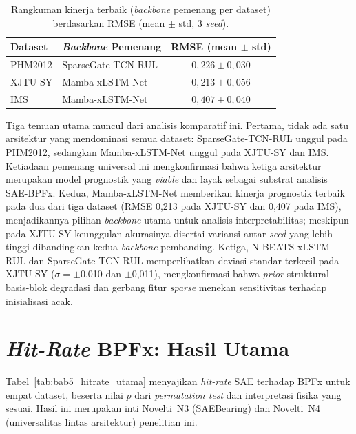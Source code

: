 \begin{table}[ht]
\centering
\caption{Rangkuman kinerja terbaik (\emph{backbone} pemenang per dataset)
         berdasarkan RMSE (mean $\pm$ std, 3 \emph{seed}).}
\label{tab:bab5_ringkasan_rul}
\small
\begin{tabular}{@{}llc@{}}
\toprule
\textbf{Dataset} & \textbf{\emph{Backbone} Pemenang} &
  \textbf{RMSE (mean $\pm$ std)} \\
\midrule
PHM2012  & SparseGate-TCN-RUL   & $0{,}226 \pm 0{,}030$ \\
XJTU-SY & Mamba-xLSTM-Net      & $0{,}213 \pm 0{,}056$ \\
IMS      & Mamba-xLSTM-Net       & $0{,}407 \pm 0{,}040$ \\
\bottomrule
\end{tabular}
\end{table}

Tiga temuan utama muncul dari analisis komparatif ini.
Pertama, tidak ada satu arsitektur yang mendominasi semua dataset:
SparseGate-TCN-RUL unggul pada PHM2012, sedangkan Mamba-xLSTM-Net unggul
pada XJTU-SY dan IMS.
Ketiadaan pemenang universal ini mengkonfirmasi bahwa ketiga arsitektur
merupakan model prognostik yang \emph{viable} dan layak sebagai substrat
analisis SAE-BPFx.
Kedua, Mamba-xLSTM-Net memberikan kinerja prognostik terbaik pada dua dari
tiga dataset (RMSE 0{,}213 pada XJTU-SY dan 0{,}407 pada IMS), menjadikannya
pilihan \emph{backbone} utama untuk analisis interpretabilitas; meskipun pada
XJTU-SY keunggulan akurasinya disertai variansi antar-\emph{seed} yang lebih
tinggi dibandingkan kedua \emph{backbone} pembanding.
Ketiga, N-BEATS-xLSTM-RUL dan SparseGate-TCN-RUL memperlihatkan deviasi
standar terkecil pada XJTU-SY ($\sigma = \pm$0{,}010 dan $\pm$0{,}011),
mengkonfirmasi bahwa \emph{prior} struktural basis-blok degradasi dan gerbang
fitur \emph{sparse} menekan sensitivitas terhadap inisialisasi acak.

\section{\emph{Hit-Rate} BPFx: Hasil Utama}
\label{sec:bab5_hitrate}

Tabel~\ref{tab:bab5_hitrate_utama} menyajikan \emph{hit-rate} SAE terhadap
BPFx untuk empat dataset, beserta nilai $p$ dari \emph{permutation test} dan
interpretasi fisika yang sesuai.
Hasil ini merupakan inti Novelti~N3 (SAEBearing) dan Novelti~N4 (universalitas
lintas arsitektur) penelitian ini.

